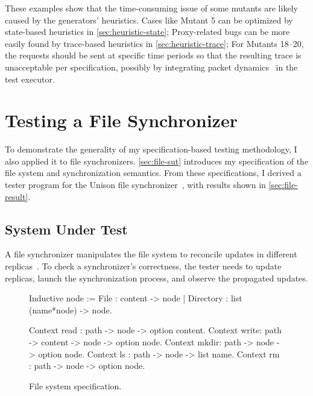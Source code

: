 
These examples show that the time-consuming issue of some mutants are likely
caused by the generators' heuristics.  Cases like Mutant 5 can be optimized by
state-based heuristics in \autoref{sec:heuristic-state}; Proxy-related bugs can
be more easily found by trace-based heuristics in \autoref{sec:heuristic-trace};
For Mutants 18--20, the requests should be sent at specific time periods so that
the resulting trace is unacceptable per specification, possibly by integrating
packet dynamics~\cite{pkt-dyn} in the test executor.

\section{Testing a File Synchronizer}
\label{sec:sync}

To demonstrate the generality of my specification-based testing methodology, I
also applied it to file synchronizers.  \autoref{sec:file-sut} introduces my
specification of the file system and synchronization semantics.  From these
specifications, I derived a tester program for the Unison file
synchronizer~\cite{unison}, with results shown in \autoref{sec:file-result}.

\subsection{System Under Test}
\label{sec:file-sut}
A file synchronizer manipulates the file system to reconcile updates in
different replicas~\cite{what-sync}.  To check a synchronizer's correctness, the
tester needs to update replicas, launch the synchronization process, and observe
the propagated updates.

\begin{figure}
\begin{coq}
  Inductive node :=
    File      : content          -> node
  | Directory : list (name*node) -> node.

  Context read : path -> node    -> option content.
  Context write: path -> content -> node -> option node.
  Context mkdir: path -> node    -> option node.
  Context ls   : path -> node    -> list name.
  Context rm   : path -> node    -> option node.
\end{coq}
\vspace*{1em}
\caption{File system specification.}
\label{fig:file-spec}
\end{figure}

